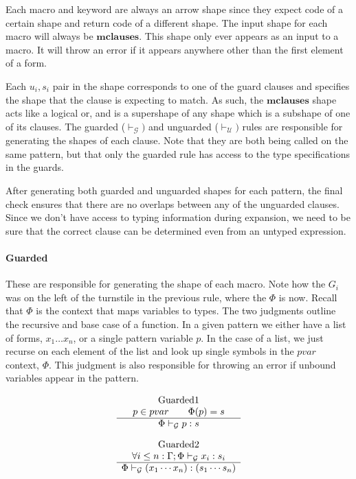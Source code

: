 \documentclass[11pt]{article}
\begin{document}
Each macro and keyword are always an arrow shape since they expect code of a certain shape and return code of a different shape. The input shape for each macro will always be $\textbf{mclauses}$. This shape only ever appears as an input to a macro.  It will throw an error if it appears anywhere other than the first element of a form. 

Each $u_i, s_i$ pair in the shape corresponds to one of the guard clauses and specifies the shape that the clause is expecting to match. As such, the $\textbf{mclauses}$ shape acts like a logical or, and is a supershape of any shape which is a subshape of one of its clauses. The guarded ($\vdash_\mathcal G)$ and unguarded ($\vdash_\mathcal U)$ rules are responsible for generating the shapes of each clause. Note that they are both being called on the same pattern, but that only the guarded rule has access to the type specifications in the guards. 

After generating both guarded and unguarded shapes for each pattern, the final check ensures that there are no overlaps between any of the unguarded clauses. Since we don't have access to typing information during expansion, we need to be sure that the correct clause can be determined even from an untyped expression.

\paragraph{Guarded}

These are responsible for generating the shape of each macro. Note how the $G_i$ was on the left of the turnstile in the previous rule, where the $\Phi$ is now. Recall that $\Phi$ is the context that maps variables to types. The two judgments outline the recursive and base case of a function. In a given pattern we either have a list of forms, $x_1\dots x_n$, or a single pattern variable $p$. In the case of a list, we just recurse on each element of the list and look up single symbols in the $pvar$ context, $\Phi$. This judgment is also responsible for throwing an error if unbound variables appear in the pattern.

\[\begin{array}{c}
\text{Guarded1}\\
p \in pvar \qquad \Phi(p) = s \\\hline
\Phi \vdash_\mathcal G p : s
\\[0.35cm]
\text{Guarded2}\\
\forall i \le n : \Gamma;\Phi \vdash_\mathcal G x_i : s_i \\\hline
\Phi \vdash_\mathcal G (x_1 \cdots x_n) : (s_1 \cdots s_n)
\end{array} \\[0.5cm]\]
\end{document}
